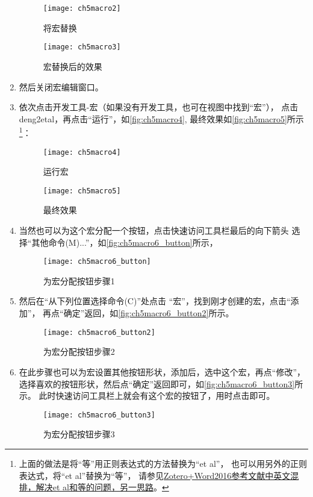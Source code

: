 \documentclass[cn,11pt,chinese]{elegantbook}
\begin{document}
\begin{enumerate}
			\begin{figure}[htbp]
				\centering
				\texttt{[image: ch5macro2]}
				\caption{将宏替换}
				\label{fig:ch5macro2}
			\end{figure}
			\begin{figure}[htbp]
				\centering
				\texttt{[image: ch5macro3]}
				\caption{宏替换后的效果}
				\label{fig:ch5macro3}
			\end{figure}
		\item 然后关闭宏编辑窗口。
		\item 依次点击开发工具-宏（如果没有开发工具，也可在视图中找到“宏”），
		点击deng2etal，再点击“运行”，如\autoref{fig:ch5macro4},
		最终效果如\autoref{fig:ch5macro5}所示\footnote{
			上面的做法是将“等”用正则表达式的方法替换为“et al”，
						也可以用另外的正则表达式，将“et al”替换为“等”，
						请参见\href{https://zhuanlan.zhihu.com/p/60029219}
						{Zotero+Word2016参考文献中英文混排，解决et al和等的问题，另一思路}。
		}：
			\begin{figure}[htbp]
				\centering
				\texttt{[image: ch5macro4]}
				\caption{运行宏}
				\label{fig:ch5macro4}
			\end{figure}
			\begin{figure}[htbp]
				\centering
				\texttt{[image: ch5macro5]}
				\caption{最终效果}
				\label{fig:ch5macro5}
			\end{figure}
		\item 当然也可以为这个宏分配一个按钮，点击快速访问工具栏最后的向下箭头
		选择“其他命令(M)...”，如\autoref{fig:ch5macro6_button}所示，	
				\begin{figure}[htbp]
					\centering
					\texttt{[image: ch5macro6\_button]}
					\caption{为宏分配按钮步骤1}
					\label{fig:ch5macro6_button}
				\end{figure}
		\item 然后在“从下列位置选择命令(C)”处点击 “宏”，找到刚才创建的宏，点击“添加”，
		再点“确定”返回，如\autoref{fig:ch5macro6_button2}所示。		
				\begin{figure}[htbp]
					\centering
					\texttt{[image: ch5macro6\_button2]}
					\caption{为宏分配按钮步骤2}
					\label{fig:ch5macro6_button2}
				\end{figure}
		\item 在此步骤也可以为宏设置其他按钮形状，添加后，选中这个宏，再点“修改”，
		选择喜欢的按钮形状，然后点“确定”返回即可，如\autoref{fig:ch5macro6_button3}所示。
		此时快速访问工具栏上就会有这个宏的按钮了，用时点击即可。	
			\begin{figure}[htbp]
				\centering
				\texttt{[image: ch5macro6\_button3]}
				\caption{为宏分配按钮步骤3}
				\label{fig:ch5macro6_button3}
			\end{figure}
		\end{enumerate}
			
\end{document}
